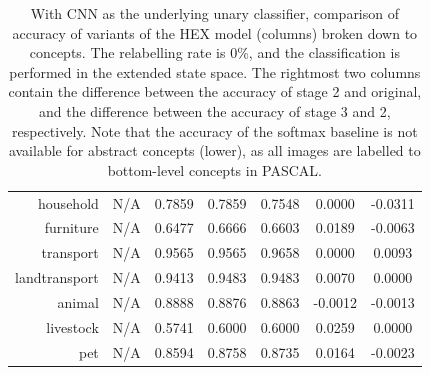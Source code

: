 \documentclass[11pt,a4paper]{article}
\begin{document}
\begin{table}[htbp]
\begin{tabular}{r|c|c|c|c|c|c}
household     & N/A    & 0.7859 & 0.7859 & 0.7548 & 0.0000 & -0.0311\\
furniture     & N/A    & 0.6477 & 0.6666 & 0.6603 & 0.0189 & -0.0063\\
transport     & N/A    & 0.9565 & 0.9565 & 0.9658 & 0.0000 & 0.0093\\
landtransport & N/A    & 0.9413 & 0.9483 & 0.9483 & 0.0070 & 0.0000\\
animal        & N/A    & 0.8888 & 0.8876 & 0.8863 & -0.0012 & -0.0013\\
livestock     & N/A    & 0.5741 & 0.6000 & 0.6000 & 0.0259 & 0.0000\\
pet           & N/A    & 0.8594 & 0.8758 & 0.8735 & 0.0164 & -0.0023
\end{tabular}
\caption{With CNN as the underlying unary classifier, comparison of accuracy of variants of the HEX model (columns) broken down to concepts. The relabelling rate is 0\%, and the classification is performed in the extended state space. The rightmost two columns contain the difference between the accuracy of stage 2 and original, and the difference between the accuracy of stage 3 and 2, respectively. Note that the accuracy of the softmax baseline is not available for abstract concepts (lower), as all images are labelled to bottom-level concepts in PASCAL.}
\label{tab:cnn0acc}
\end{table}
\end{document}
